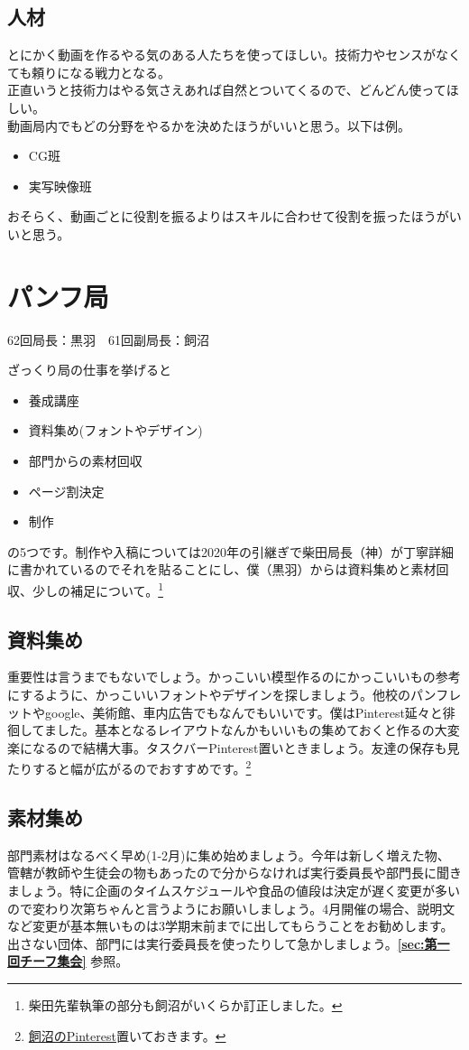 \documentclass[dvipdfmx,jb5]{jreport}
\newcommand{\Chapter}[1]{\chapter{#1}\thispagestyle{fancy}}
\begin{document}
\section{人材}
とにかく動画を作るやる気のある人たちを使ってほしい。技術力やセンスがなくても頼りになる戦力となる。\\
正直いうと技術力はやる気さえあれば自然とついてくるので、どんどん使ってほしい。\\
動画局内でもどの分野をやるかを決めたほうがいいと思う。以下は例。
\begin{itemize}
      \item CG班
      \item 実写映像班
\end{itemize}
おそらく、動画ごとに役割を振るよりはスキルに合わせて役割を振ったほうがいいと思う。

\Chapter{パンフ局}
62回局長：黒羽　61回副局長：飼沼

ざっくり局の仕事を挙げると
\begin{itemize}
      \item 養成講座
      \item 資料集め(フォントやデザイン)
      \item 部門からの素材回収
      \item ページ割決定
      \item 制作
\end{itemize}

の5つです。制作や入稿については2020年の引継ぎで柴田局長（神）が丁寧詳細に書かれているのでそれを貼ることにし、僕（黒羽）からは資料集めと素材回収、少しの補足について。\footnote{柴田先輩執筆の部分も飼沼がいくらか訂正しました。}

\section{資料集め}
重要性は言うまでもないでしょう。かっこいい模型作るのにかっこいいもの参考にするように、かっこいいフォントやデザインを探しましょう。他校のパンフレットやgoogle、美術館、車内広告でもなんでもいいです。僕はPinterest延々と徘徊してました。基本となるレイアウトなんかもいいもの集めておくと作るの大変楽になるので結構大事。タスクバーPinterest置いときましょう。友達の保存も見たりすると幅が広がるのでおすすめです。\footnote{\href{https://www.pinterest.jp/mpse_}{飼沼のPinterest}置いておきます。}

\section{素材集め}
部門素材はなるべく早め(1-2月)に集め始めましょう。今年は新しく増えた物、管轄が教師や生徒会の物もあったので分からなければ実行委員長や部門長に聞きましょう。特に企画のタイムスケジュールや食品の値段は決定が遅く変更が多いので変わり次第ちゃんと言うようにお願いしましょう。4月開催の場合、説明文など変更が基本無いものは3学期末前までに出してもらうことをお勧めします。出さない団体、部門には実行委員長を使ったりして急かしましょう。{\bf \ref{sec:第一回チーフ集会}} 参照。
\end{document}
